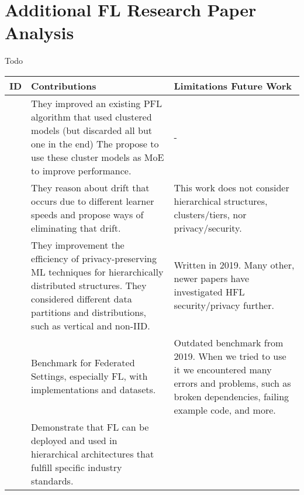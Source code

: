 \appendix
\appendixpage
\addappheadtotoc

\chapter{Additional FL Research Paper Analysis}\label{appendix:data-collection}
Todo

\begin{changemargin}{-2cm}{0cm} 
    \begin{tabular}{|c||m{0.4\paperwidth}|m{0.4\paperwidth}|}
        \hline
            ID & Contributions & Limitations Future Work \\
        \hline
            \cite{paper:adaptive_exper_models_for_pfl}
            &
            They improved an existing PFL algorithm that used clustered models (but discarded all but one in the end)
            The propose to use these cluster models as MoE to improve performance.
            &
            -
        \\
        \hline
            \cite{paper:tackling_objective_inconsistency_problem_in_heterogeneous_fl}
            &
            They reason about drift that occurs due to different learner speeds
            and propose ways of eliminating that drift.
            &
            This work does not consider hierarchical structures,
            clusters/tiers, nor privacy/security.
        \\
        \hline
            \cite{paper:efficient_privacy_preserving_ml_in_hierarchical_distributed_systems}
            &
            They improvement the efficiency of privacy-preserving ML techniques for hierarchically distributed structures.
            They considered different data partitions and distributions, such as vertical and non-IID.
            &
            Written in 2019.
            Many other, newer papers have investigated HFL security/privacy further.
        \\
        \hline
            \cite{paper:leaf_fl_benchmark}
            &
            Benchmark for Federated Settings, especially FL, with implementations and datasets.
            &
            Outdated benchmark from 2019.
            When we tried to use it we encountered many errors and problems,
            such as broken dependencies, failing example code, and more.
        \\
        \hline
            \cite{paper:deploying_fl_in_hierarchical_edge_architecture}
            &
            Demonstrate that FL can be deployed and used in hierarchical architectures that fulfill specific industry standards.

\end{tabular}
\end{changemargin}
